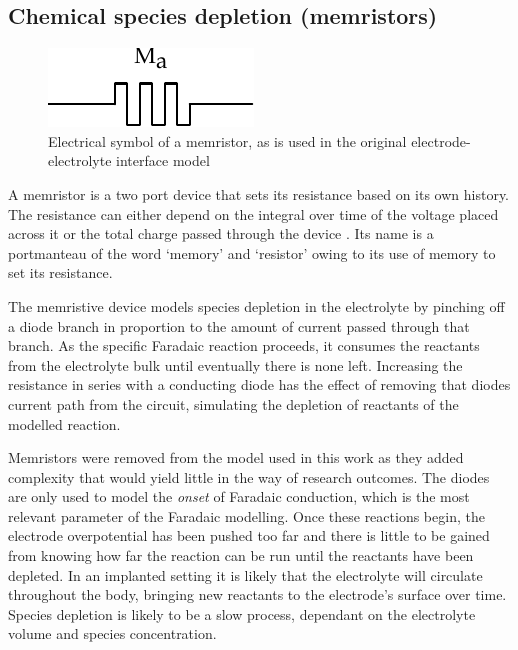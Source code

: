   \subsection{Chemical species depletion (memristors)}


    \begin{figure}[h]
      \centering
      \includegraphics{content/pt2/07-InterfaceModel/graphics/memristorSymbol}
      \caption{\label{fig:pt2-memristorSymbol}Electrical symbol of a memristor, as is used in the original electrode-electrolyte interface model}
    \end{figure}

    A memristor is a two port device that sets its resistance based on its own history.
    The resistance can either depend on the integral over time of the voltage placed across it or the total charge passed through the device \cite{Kvatinsky2012}.
    Its name is a portmanteau of the word `memory' and `resistor' owing to its use of memory to set its resistance.

    The memristive device models species depletion in the electrolyte by pinching off a diode branch in proportion to the amount of current passed through that branch.
    As the specific Faradaic reaction proceeds, it consumes the reactants from the electrolyte bulk until eventually there is none left.
    Increasing the resistance in series with a conducting diode has the effect of removing that diodes current path from the circuit, simulating the depletion of reactants of the modelled reaction.

    Memristors were removed from the model used in this work as they added complexity that would yield little in the way of research outcomes.
    The diodes are only used to model the \emph{onset} of Faradaic conduction, which is the most relevant parameter of the Faradaic modelling.
    Once these reactions begin, the electrode overpotential has been pushed too far and there is little to be gained from knowing how far the reaction can be run until the reactants have been depleted.
    In an implanted setting it is likely that the electrolyte will circulate throughout the body, bringing new reactants to the electrode's surface over time.
    Species depletion is likely to be a slow process, dependant on the electrolyte volume and species concentration.


